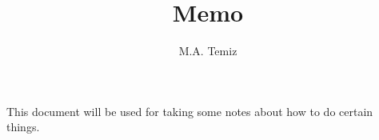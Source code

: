 \documentclass{article}
\title{Memo}
\author{M.A. Temiz}
\begin{document}
\maketitle
This document will be used for taking some notes about how to do certain things.
\end{document}
